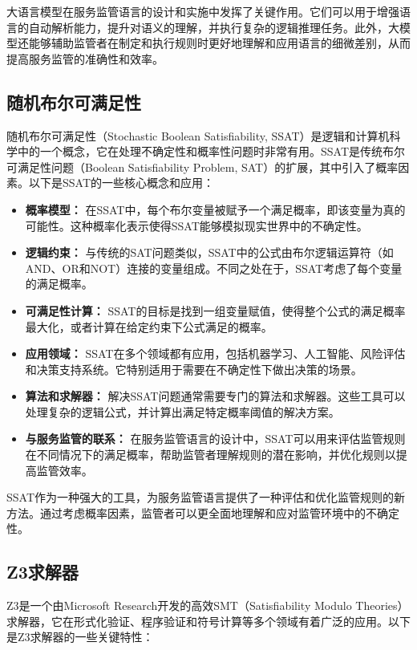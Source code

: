 大语言模型在服务监管语言的设计和实施中发挥了关键作用。它们可以用于增强语言的自动解析能力，提升对语义的理解，并执行复杂的逻辑推理任务。此外，大模型还能够辅助监管者在制定和执行规则时更好地理解和应用语言的细微差别，从而提高服务监管的准确性和效率。

\subsection{随机布尔可满足性}
随机布尔可满足性（Stochastic Boolean Satisfiability, SSAT）是逻辑和计算机科学中的一个概念，它在处理不确定性和概率性问题时非常有用。SSAT是传统布尔可满足性问题（Boolean Satisfiability Problem, SAT）的扩展，其中引入了概率因素。以下是SSAT的一些核心概念和应用：

\begin{itemize}
    \item \textbf{概率模型：} 在SSAT中，每个布尔变量被赋予一个满足概率，即该变量为真的可能性。这种概率化表示使得SSAT能够模拟现实世界中的不确定性。
    \item \textbf{逻辑约束：} 与传统的SAT问题类似，SSAT中的公式由布尔逻辑运算符（如AND、OR和NOT）连接的变量组成。不同之处在于，SSAT考虑了每个变量的满足概率。
    \item \textbf{可满足性计算：} SSAT的目标是找到一组变量赋值，使得整个公式的满足概率最大化，或者计算在给定约束下公式满足的概率。
    \item \textbf{应用领域：} SSAT在多个领域都有应用，包括机器学习、人工智能、风险评估和决策支持系统。它特别适用于需要在不确定性下做出决策的场景。
    \item \textbf{算法和求解器：} 解决SSAT问题通常需要专门的算法和求解器。这些工具可以处理复杂的逻辑公式，并计算出满足特定概率阈值的解决方案。
    \item \textbf{与服务监管的联系：} 在服务监管语言的设计中，SSAT可以用来评估监管规则在不同情况下的满足概率，帮助监管者理解规则的潜在影响，并优化规则以提高监管效率。
\end{itemize}

SSAT作为一种强大的工具，为服务监管语言提供了一种评估和优化监管规则的新方法。通过考虑概率因素，监管者可以更全面地理解和应对监管环境中的不确定性。

\subsection{Z3求解器}
Z3是一个由Microsoft Research开发的高效SMT（Satisfiability Modulo Theories）求解器，它在形式化验证、程序验证和符号计算等多个领域有着广泛的应用。以下是Z3求解器的一些关键特性：

